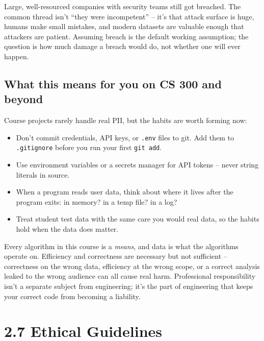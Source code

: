 \documentclass[11pt]{article}
\begin{document}
\begin{notebox}
Large, well-resourced companies with security teams still got
breached. The common thread isn't ``they were incompetent'' -- it's
that attack surface is huge, humans make small mistakes, and modern
datasets are valuable enough that attackers are patient. Assuming
breach is the default working assumption; the question is how much
damage a breach would do, not whether one will ever happen.
\end{notebox}

\subsection{What this means for you on CS 300 and beyond}

Course projects rarely handle real PII, but the habits are worth
forming now:

\begin{itemize}[leftmargin=*,noitemsep]
    \item Don't commit credentials, API keys, or \texttt{.env} files
          to git. Add them to \texttt{.gitignore} before you run your
          first \texttt{git add}.
    \item Use environment variables or a secrets manager for
          API tokens -- never string literals in source.
    \item When a program reads user data, think about where it lives
          after the program exits: in memory? in a temp file? in a
          log?
    \item Treat student test data with the same care you would real
          data, so the habits hold when the data does matter.
\end{itemize}

\begin{ideabox}
Every algorithm in this course is a \emph{means}, and data is what
the algorithms operate on. Efficiency and correctness are necessary
but not sufficient -- correctness on the wrong data, efficiency at
the wrong scope, or a correct analysis leaked to the wrong audience
can all cause real harm. Professional responsibility isn't a separate
subject from engineering; it's the part of engineering that keeps
your correct code from becoming a liability.
\end{ideabox}

\section{2.7 Ethical Guidelines}
\end{document}
